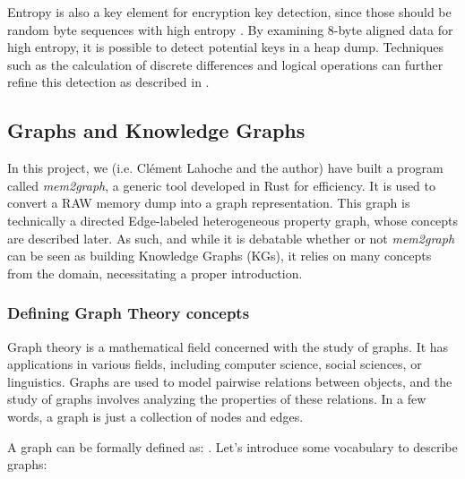     Entropy is also a key element for encryption key detection, since those should be random byte sequences with high entropy \cite{SmartKex22}. By examining 8-byte aligned data for high entropy, it is possible to detect potential keys in a heap dump. Techniques such as the calculation of discrete differences and logical operations can further refine this detection as described in  \cite{SmartKex22}.

    \subsection{Graphs and Knowledge Graphs}
    In this project, we (i.e. Clément Lahoche and the author) have built a program called \textit{mem2graph}, a generic tool developed in Rust for efficiency. It is used to convert a RAW memory dump into a graph representation. This graph is technically a directed Edge-labeled heterogeneous property graph, whose concepts are described later. As such, and while it is debatable whether or not \textit{mem2graph} can be seen as building Knowledge Graphs (KGs), it relies on many concepts from the domain, necessitating a proper introduction.

    \subsubsection{Defining Graph Theory concepts}
    Graph theory is a mathematical field concerned with the study of graphs. It has applications in various fields, including computer science, social sciences, or linguistics. Graphs are used to model pairwise relations between objects, and the study of graphs involves analyzing the properties of these relations. In a few words, a graph is just a collection of nodes and edges.
    
    A graph can be formally defined  as:  \cite{GraphTheorySolnon}. Let's introduce some vocabulary to describe graphs:

